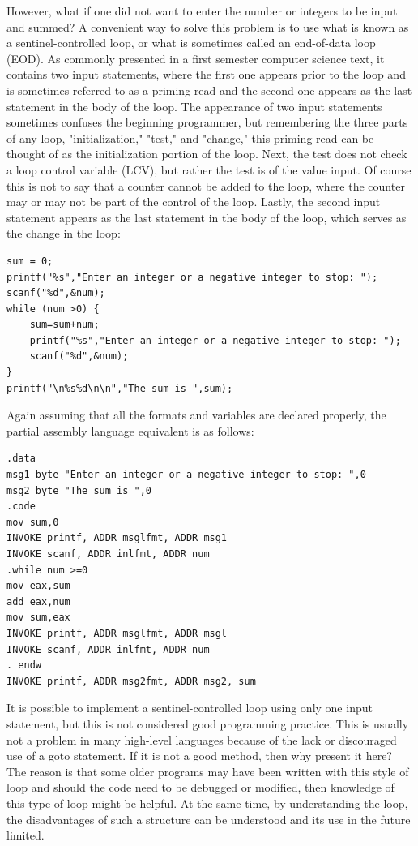 \documentclass[10pt]{article}
\begin{document}
However, what if one did not want to enter the number or integers to be input and summed? A convenient way to solve this problem is to use what is known as a sentinel-controlled loop, or what is sometimes called an end-of-data loop (EOD). As commonly presented in a first semester computer science text, it contains two input statements, where the first one appears prior to the loop and is sometimes referred to as a priming read and the second one appears as the last statement in the body of the loop. The appearance of two input statements sometimes confuses the beginning programmer, but remembering the three parts of any loop, "initialization," "test," and "change," this priming read can be thought of as the initialization portion of the loop. Next, the test does not check a loop control variable (LCV), but rather the test is of the value input. Of course this is not to say that a counter cannot be added to the loop, where the counter may or may not be part of the control of the loop. Lastly, the second input statement appears as the last statement in the body of the loop, which serves as the change in the loop:

\begin{verbatim}
sum = 0;
printf("%s","Enter an integer or a negative integer to stop: ");
scanf("%d",&num);
while (num >0) {
    sum=sum+num;
    printf("%s","Enter an integer or a negative integer to stop: ");
    scanf("%d",&num);
}
printf("\n%s%d\n\n","The sum is ",sum);
\end{verbatim}

Again assuming that all the formats and variables are declared properly, the partial assembly language equivalent is as follows:

\begin{verbatim}
.data
msg1 byte "Enter an integer or a negative integer to stop: ",0
msg2 byte "The sum is ",0
.code
mov sum,0
INVOKE printf, ADDR msglfmt, ADDR msg1
INVOKE scanf, ADDR inlfmt, ADDR num
.while num >=0
mov eax,sum
add eax,num
mov sum,eax
INVOKE printf, ADDR msglfmt, ADDR msgl
INVOKE scanf, ADDR inlfmt, ADDR num
. endw
INVOKE printf, ADDR msg2fmt, ADDR msg2, sum
\end{verbatim}

It is possible to implement a sentinel-controlled loop using only one input statement, but this is not considered good programming practice. This is usually not a problem in many high-level languages because of the lack or discouraged use of a goto statement. If it is not a good method, then why present it here? The reason is that some older programs may have been written with this style of loop and should the code need to be debugged or modified, then knowledge of this type of loop might be helpful. At the same time, by understanding the loop, the disadvantages of such a structure can be understood and its use in the future limited.
\end{document}
